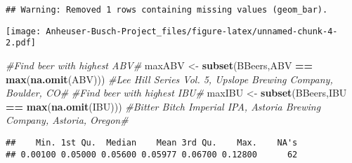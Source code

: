 \documentclass[]{article}
\newenvironment{Shaded}{\begin{snugshade}}{\end{snugshade}}
\newcommand{\CommentTok}[1]{\textcolor[rgb]{0.56,0.35,0.01}{\textit{#1}}}
\newcommand{\DataTypeTok}[1]{\textcolor[rgb]{0.13,0.29,0.53}{#1}}
\newcommand{\KeywordTok}[1]{\textcolor[rgb]{0.13,0.29,0.53}{\textbf{#1}}}
\newcommand{\NormalTok}[1]{#1}
\newcommand{\OperatorTok}[1]{\textcolor[rgb]{0.81,0.36,0.00}{\textbf{#1}}}
\newcommand{\StringTok}[1]{\textcolor[rgb]{0.31,0.60,0.02}{#1}}
\begin{document}
\begin{Shaded}
\end{Shaded}

\begin{verbatim}
## Warning: Removed 1 rows containing missing values (geom_bar).
\end{verbatim}

\texttt{[image: Anheuser-Busch-Project\_files/figure-latex/unnamed-chunk-4-2.pdf]}

\begin{Shaded}
\begin{Highlighting}[]
\CommentTok{#Find beer with highest ABV#}
\NormalTok{maxABV <-}\StringTok{ }\KeywordTok{subset}\NormalTok{(BBeers,ABV }\OperatorTok{==}\StringTok{ }\KeywordTok{max}\NormalTok{(}\KeywordTok{na.omit}\NormalTok{(ABV)))}
\CommentTok{#Lee Hill Series Vol. 5, Upslope Brewing Company, Boulder, CO#}
\CommentTok{#Find beer with highest IBU#}
\NormalTok{maxIBU <-}\StringTok{ }\KeywordTok{subset}\NormalTok{(BBeers,IBU }\OperatorTok{==}\StringTok{ }\KeywordTok{max}\NormalTok{(}\KeywordTok{na.omit}\NormalTok{(IBU)))}
\CommentTok{#Bitter Bitch Imperial IPA, Astoria Brewing Company, Astoria, Oregon#}
\end{Highlighting}
\end{Shaded}

\begin{Shaded}
\end{Shaded}

\begin{verbatim}
##    Min. 1st Qu.  Median    Mean 3rd Qu.    Max.    NA's 
## 0.00100 0.05000 0.05600 0.05977 0.06700 0.12800      62
\end{verbatim}
\end{document}
